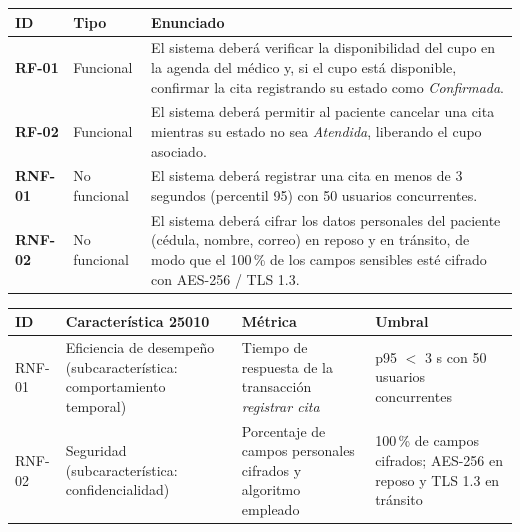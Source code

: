 \documentclass[11pt,a4paper,oneside]{article}
\begin{document}
	{\footnotesize
		\begin{center}
			\begin{tabularx}{\textwidth}{|C{1.4cm}|C{1.6cm}|Y|}
				\hline
				\textbf{ID} & \textbf{Tipo} & \textbf{Enunciado} \\ \hline
				\textbf{RF-01} & Funcional & El sistema deberá verificar la disponibilidad del cupo en la agenda del médico y, si el cupo está disponible, confirmar la cita registrando su estado como \emph{Confirmada}. \\ \hline
				\textbf{RF-02} & Funcional & El sistema deberá permitir al paciente cancelar una cita mientras su estado no sea \emph{Atendida}, liberando el cupo asociado. \\ \hline
				\textbf{RNF-01} & No funcional & El sistema deberá registrar una cita en menos de 3 segundos (percentil 95) con 50 usuarios concurrentes. \\ \hline
				\textbf{RNF-02} & No funcional & El sistema deberá cifrar los datos personales del paciente (cédula, nombre, correo) en reposo y en tránsito, de modo que el 100\,\% de los campos sensibles esté cifrado con AES-256 / TLS 1.3. \\ \hline
			\end{tabularx}
		\end{center}
		
		\begin{center}
			\begin{tabularx}{\textwidth}{|C{1.4cm}|L{3.6cm}|L{4.0cm}|Y|}
				\hline
				\textbf{ID} & \textbf{Característica 25010} & \textbf{Métrica} & \textbf{Umbral} \\ \hline
				RNF-01 & Eficiencia de desempeño (subcaracterística: comportamiento temporal) & Tiempo de respuesta de la transacción \emph{registrar cita} & p95 $<$ 3 s con 50 usuarios concurrentes \\ \hline
				RNF-02 & Seguridad (subcaracterística: confidencialidad) & Porcentaje de campos personales cifrados y algoritmo empleado & 100\,\% de campos cifrados; AES-256 en reposo y TLS 1.3 en tránsito \\ \hline
			\end{tabularx}
		\end{center}
		
}
\end{document}
